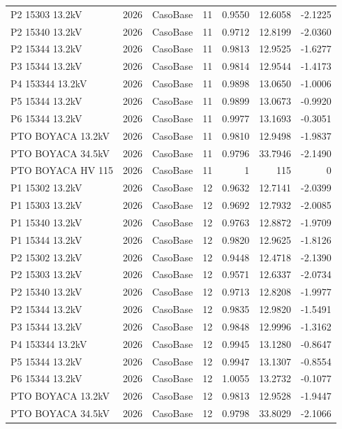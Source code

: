 \documentclass[11pt,a4paper]{article}
\begin{document}
\begin{longtable}{llllrrr}
P2 15303 13.2kV & 2026 & CasoBase & 11 & 0.9550 & 12.6058 & -2.1225 \\
P2 15340 13.2kV & 2026 & CasoBase & 11 & 0.9712 & 12.8199 & -2.0360 \\
P2 15344 13.2kV & 2026 & CasoBase & 11 & 0.9813 & 12.9525 & -1.6277 \\
P3 15344 13.2kV & 2026 & CasoBase & 11 & 0.9814 & 12.9544 & -1.4173 \\
P4 153344 13.2kV & 2026 & CasoBase & 11 & 0.9898 & 13.0650 & -1.0006 \\
P5 15344 13.2kV & 2026 & CasoBase & 11 & 0.9899 & 13.0673 & -0.9920 \\
P6 15344 13.2kV & 2026 & CasoBase & 11 & 0.9977 & 13.1693 & -0.3051 \\
PTO BOYACA 13.2kV & 2026 & CasoBase & 11 & 0.9810 & 12.9498 & -1.9837 \\
PTO BOYACA 34.5kV & 2026 & CasoBase & 11 & 0.9796 & 33.7946 & -2.1490 \\
PTO BOYACA HV 115 & 2026 & CasoBase & 11 & 1 & 115 & 0 \\
P1 15302 13.2kV & 2026 & CasoBase & 12 & 0.9632 & 12.7141 & -2.0399 \\
P1 15303 13.2kV & 2026 & CasoBase & 12 & 0.9692 & 12.7932 & -2.0085 \\
P1 15340 13.2kV & 2026 & CasoBase & 12 & 0.9763 & 12.8872 & -1.9709 \\
P1 15344 13.2kV & 2026 & CasoBase & 12 & 0.9820 & 12.9625 & -1.8126 \\
P2 15302 13.2kV & 2026 & CasoBase & 12 & 0.9448 & 12.4718 & -2.1390 \\
P2 15303 13.2kV & 2026 & CasoBase & 12 & 0.9571 & 12.6337 & -2.0734 \\
P2 15340 13.2kV & 2026 & CasoBase & 12 & 0.9713 & 12.8208 & -1.9977 \\
P2 15344 13.2kV & 2026 & CasoBase & 12 & 0.9835 & 12.9820 & -1.5491 \\
P3 15344 13.2kV & 2026 & CasoBase & 12 & 0.9848 & 12.9996 & -1.3162 \\
P4 153344 13.2kV & 2026 & CasoBase & 12 & 0.9945 & 13.1280 & -0.8647 \\
P5 15344 13.2kV & 2026 & CasoBase & 12 & 0.9947 & 13.1307 & -0.8554 \\
P6 15344 13.2kV & 2026 & CasoBase & 12 & 1.0055 & 13.2732 & -0.1077 \\
PTO BOYACA 13.2kV & 2026 & CasoBase & 12 & 0.9813 & 12.9528 & -1.9447 \\
PTO BOYACA 34.5kV & 2026 & CasoBase & 12 & 0.9798 & 33.8029 & -2.1066 \\

\end{longtable}
\end{document}
